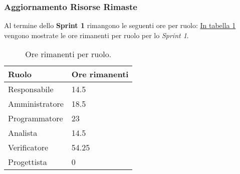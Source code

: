 \subsubsection{Aggiornamento Risorse Rimaste}
Al termine dello \textbf{Sprint 1} rimangono le seguenti ore per ruolo: \hyperref[tab:sprint1_ore_rimanenti]{In tabella \ref{tab:sprint1_ore_rimanenti}} vengono mostrate le ore rimanenti per ruolo per lo \textit{Sprint 1}.

\begin{table}[!h]
    \centering
    \begin{tabular}{| l | l |}
    \hline
    \textbf{Ruolo} & 
    \textbf{Ore rimanenti}\\
    \hline
        Responsabile & 14.5\\
    \hline
        Amministratore & 18.5\\
    \hline
        Programmatore & 23\\
    \hline
        Analista & 14.5 \\
    \hline
        Verificatore & 54.25 \\
    \hline
        Progettista & 0 \\
    \hline
    \end{tabular}
    \caption{Ore rimanenti per ruolo.}
    \label{tab:sprint1_ore_rimanenti} 
\end{table}
